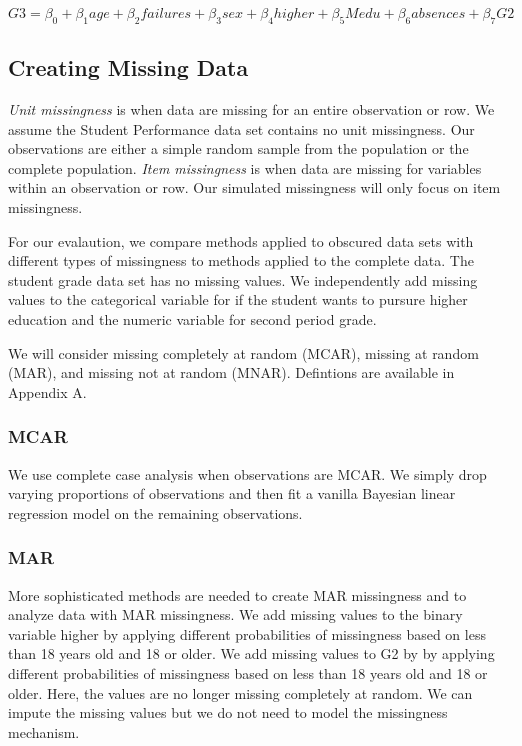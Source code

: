 \documentclass[11pt]{article}
\begin{document}
$$G3 = \beta_0 + \beta_1 age + \beta_2 failures + \beta_3 sex + \beta_4 higher + \beta_5 Medu + \beta_6 absences + \beta_7 G2$$

\subsection{Creating Missing Data}

\textit{Unit missingness} is when data are missing for an entire observation or row. We assume the Student Performance data set contains no unit missingness. Our observations are either a simple random sample from the population or the complete population. \textit{Item missingness} is when data are missing for variables within an observation or row. Our simulated missingness will only focus on item missingness.

For our evalaution, we compare methods applied to obscured data sets with different types of missingness to methods applied to the complete data. The student grade data set has no missing values. We independently add missing values to the categorical variable for if the student wants to pursure higher education and the numeric variable for second period grade. 

We will consider missing completely at random (MCAR), missing at random (MAR), and missing not at random (MNAR). Defintions are available in Appendix A. 

\subsubsection{MCAR}

We use complete case analysis when observations are MCAR. We simply drop varying proportions of observations and then fit a vanilla Bayesian linear regression model on the remaining observations. 

\subsubsection{MAR}

More sophisticated methods are needed to create MAR missingness and to analyze data with MAR missingness. We add missing values to the binary variable higher by applying different probabilities of missingness based on less than 18 years old and 18 or older. We add missing values to G2 by by applying different probabilities of missingness based on less than 18 years old and 18 or older. Here, the values are no longer missing completely at random. We can impute the missing values but we do not need to model the missingness mechanism. 
\end{document}
